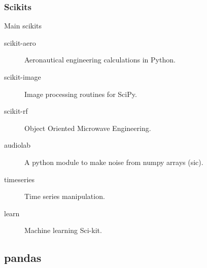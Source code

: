 \documentclass[10pt, colorlinks]{beamer}
\begin{document}
\begin{frame}[fragile]\frametitle{Scikits}
\begin{block}{Main scikits}
\begin{description}
    \item[scikit-aero]  Aeronautical engineering calculations in Python.
    \item[scikit-image] Image processing routines for SciPy.
    \item[scikit-rf] Object Oriented Microwave Engineering.
    \item[audiolab] A python module to make noise from numpy arrays (sic).
    \item[timeseries] Time series manipulation.
    \item[learn] Machine learning Sci-kit. 
\end{description}
\end{block}

\end{frame}

\subsection{pandas} %
\label{sec:scikit timeseries}
\end{document}
